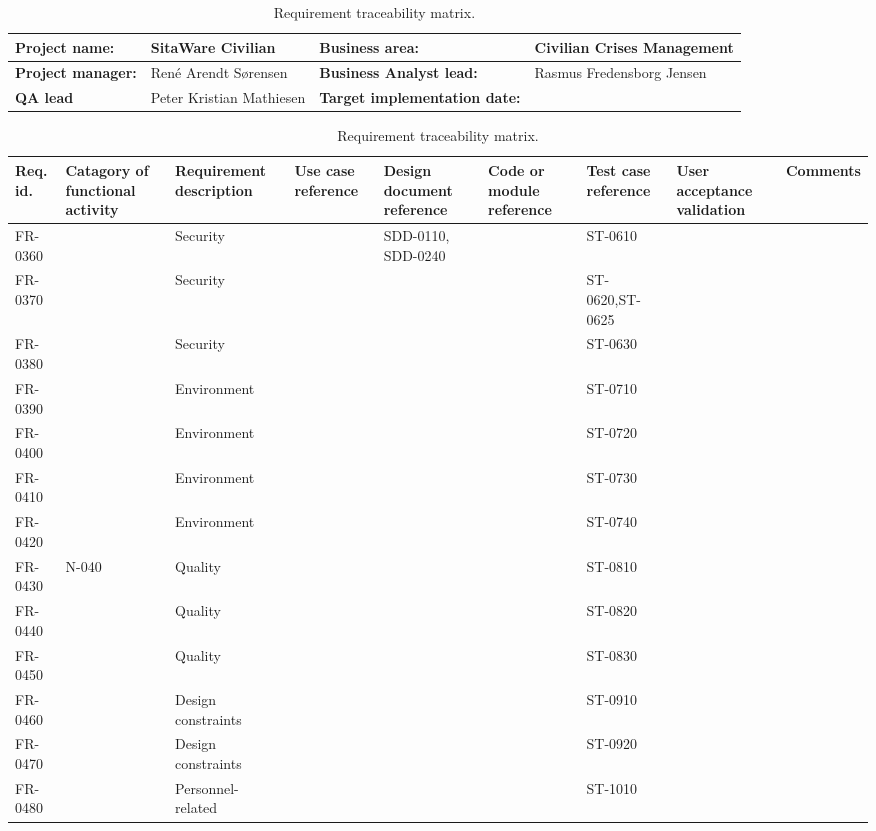 \begin{sidewaystable}
\begin{table}[H]
\begin{tabular}{|l|l|l|l|}
\hline
 \textbf{Project name:} & SitaWare Civilian & \textbf{Business area:}  & Civilian Crises Management\\ \hline
 \textbf{Project manager:} & René Arendt Sørensen & \textbf{Business Analyst lead:} & Rasmus Fredensborg  Jensen\\ \hline
 \textbf{QA lead} & Peter Kristian Mathiesen & \textbf{Target implementation date:}  & \\ \hline
\end{tabular}	
\begin{tabular}{|p{2cm}|p{2cm}|p{3cm}|p{2cm}|p{2cm}|p{2cm}|p{2cm}|p{2cm}|p{2cm}|}
\hline
 Req. id. & Catagory of functional activity & Requirement description  & Use case reference & Design document reference & Code or module reference & Test case reference & User acceptance validation & Comments\\ \hline
  FR-0360 & & Security & &SDD-0110, SDD-0240 & & ST-0610 & &\\ \hline
 FR-0370 & & Security & && & ST-0620,ST-0625 & &\\ \hline   	
 FR-0380 & & Security & && & ST-0630 & &\\ \hline
 FR-0390 & & Environment & && &ST-0710 & &\\ \hline
 FR-0400 & & Environment & && &ST-0720 & &\\ \hline
 FR-0410 & & Environment & && &ST-0730 & &\\ \hline
 FR-0420 & & Environment & && &ST-0740 & &\\ \hline
 FR-0430 & N-040 & Quality & && &ST-0810 & &\\ \hline
 FR-0440 & & Quality & && &ST-0820 & &\\ \hline
 FR-0450 & & Quality & && &ST-0830 & &\\ \hline
 FR-0460 & & Design constraints & && &ST-0910 & &\\ \hline
 FR-0470 & & Design constraints & && &ST-0920 & &\\ \hline
 FR-0480 & & Personnel-related & && &ST-1010 & &\\ \hline 
\end{tabular}	
\caption{Requirement traceability matrix.}
\end{table}

\end{sidewaystable}



